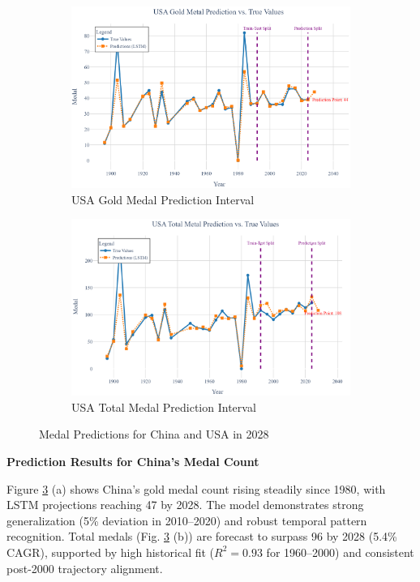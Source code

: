 \documentclass{mcmthesis}
\begin{document}
\begin{figure}[H]
	\begin{subfigure}[b]{0.48\textwidth}
		\includegraphics[width=\textwidth]{fig/USA_gold.png}
		\caption{USA Gold Medal Prediction Interval}
		\label{fig:usa_gold1}
	\end{subfigure}
	\hfill
	\begin{subfigure}[b]{0.48\textwidth}
		\includegraphics[width=\textwidth]{fig/USA_total.png}
		\caption{USA Total Medal Prediction Interval}
		\label{fig:usa_total1}
	\end{subfigure}
	\caption{Medal Predictions for China and USA in 2028}
	\label{fig:chn_usa_pred1}
	\label{all}
\end{figure}
\textbf{Prediction Results for China’s Medal Count}

Figure \ref{all} (a) shows China's gold medal count rising steadily since 1980, with LSTM projections reaching 47 by 2028. The model demonstrates strong generalization (5\% deviation in 2010–2020) and robust temporal pattern recognition. Total medals (Fig. \ref{all} (b)) are forecast to surpass 96 by 2028 (5.4\% CAGR), supported by high historical fit ($R^2=0.93$ for 1960–2000) and consistent post-2000 trajectory alignment.
\end{document}
